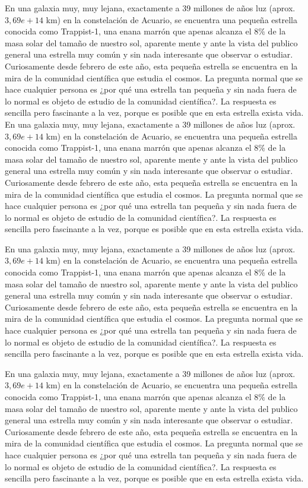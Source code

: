 \documentclass[3p,times]{elsarticle}
\begin{document}
En una galaxia muy, muy lejana, exactamente a 39 millones de años luz (aprox. $3,69e+14$ km) en la constelación de Acuario, se encuentra una pequeña estrella conocida como Trappist-1, una enana marrón  que apenas alcanza el  $8\%$ de la masa solar del tamaño de nuestro sol, aparente mente y ante la vista del publico general una estrella muy común y sin nada interesante que observar o estudiar.  Curiosamente desde febrero de este año, esta pequeña estrella se encuentra en la mira de la comunidad científica que estudia el cosmos. La pregunta normal que se hace cualquier persona es ¿por qué una estrella tan pequeña y sin nada fuera de lo normal es objeto de estudio de la comunidad científica?. La respuesta es sencilla pero fascinante a la vez, porque es posible que en esta estrella exista vida.
En una galaxia muy, muy lejana, exactamente a 39 millones de años luz (aprox. $3,69e+14$ km) en la constelación de Acuario, se encuentra una pequeña estrella conocida como Trappist-1, una enana marrón  que apenas alcanza el  $8\%$ de la masa solar del tamaño de nuestro sol, aparente mente y ante la vista del publico general una estrella muy común y sin nada interesante que observar o estudiar.  Curiosamente desde febrero de este año, esta pequeña estrella se encuentra en la mira de la comunidad científica que estudia el cosmos. La pregunta normal que se hace cualquier persona es ¿por qué una estrella tan pequeña y sin nada fuera de lo normal es objeto de estudio de la comunidad científica?. La respuesta es sencilla pero fascinante a la vez, porque es posible que en esta estrella exista vida.

En una galaxia muy, muy lejana, exactamente a 39 millones de años luz (aprox. $3,69e+14$ km) en la constelación de Acuario, se encuentra una pequeña estrella conocida como Trappist-1, una enana marrón  que apenas alcanza el  $8\%$ de la masa solar del tamaño de nuestro sol, aparente mente y ante la vista del publico general una estrella muy común y sin nada interesante que observar o estudiar.  Curiosamente desde febrero de este año, esta pequeña estrella se encuentra en la mira de la comunidad científica que estudia el cosmos. La pregunta normal que se hace cualquier persona es ¿por qué una estrella tan pequeña y sin nada fuera de lo normal es objeto de estudio de la comunidad científica?. La respuesta es sencilla pero fascinante a la vez, porque es posible que en esta estrella exista vida.


En una galaxia muy, muy lejana, exactamente a 39 millones de años luz (aprox. $3,69e+14$ km) en la constelación de Acuario, se encuentra una pequeña estrella conocida como Trappist-1, una enana marrón  que apenas alcanza el  $8\%$ de la masa solar del tamaño de nuestro sol, aparente mente y ante la vista del publico general una estrella muy común y sin nada interesante que observar o estudiar.  Curiosamente desde febrero de este año, esta pequeña estrella se encuentra en la mira de la comunidad científica que estudia el cosmos. La pregunta normal que se hace cualquier persona es ¿por qué una estrella tan pequeña y sin nada fuera de lo normal es objeto de estudio de la comunidad científica?. La respuesta es sencilla pero fascinante a la vez, porque es posible que en esta estrella exista vida.\citep{Feynman1963118}
\end{document}

